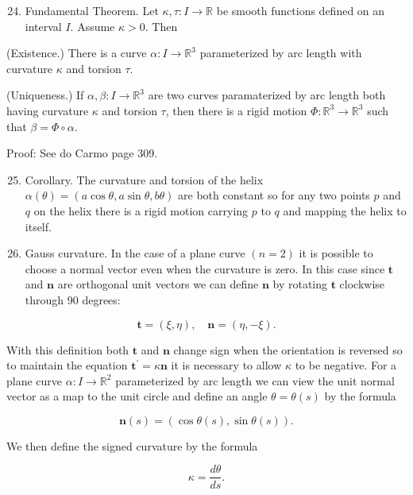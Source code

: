 \documentclass[10pt]{article}
\begin{document}
\begin{enumerate}
  \setcounter{enumi}{23}
  \item Fundamental Theorem. Let $\kappa, \tau: I \rightarrow \mathbb{R}$ be smooth functions defined on an interval $I$. Assume $\kappa>0$. Then
\end{enumerate}

(Existence.) There is a curve $\alpha: I \rightarrow \mathbb{R}^{3}$ parameterized by arc length with curvature $\kappa$ and torsion $\tau$.

(Uniqueness.) If $\alpha, \beta: I \rightarrow \mathbb{R}^{3}$ are two curves paramaterized by arc length both having curvature $\kappa$ and torsion $\tau$, then there is a rigid motion $\Phi: \mathbb{R}^{3} \rightarrow \mathbb{R}^{3}$ such that $\beta=\Phi \circ \alpha$.

Proof: See do Carmo page 309.

\begin{enumerate}
  \setcounter{enumi}{24}
  \item Corollary. The curvature and torsion of the helix $\alpha(\theta)=(a \cos \theta, a \sin \theta, b \theta)$ are both constant so for any two points $p$ and $q$ on the helix there is a rigid motion carrying $p$ to $q$ and mapping the helix to itself.

  \item Gauss curvature. In the case of a plane curve $(n=2)$ it is possible to choose a normal vector even when the curvature is zero. In this case since $\mathbf{t}$ and $\mathbf{n}$ are orthogonal unit vectors we can define $\mathbf{n}$ by rotating $\mathbf{t}$ clockwise through 90 degrees:

\end{enumerate}

$$
\mathbf{t}=(\xi, \eta), \quad \mathbf{n}=(\eta,-\xi) .
$$

With this definition both $\mathbf{t}$ and $\mathbf{n}$ change sign when the orientation is reversed so to maintain the equation $\mathbf{t}^{\prime}=\kappa \mathbf{n}$ it is necessary to allow $\kappa$ to be negative. For a plane curve $\alpha: I \rightarrow \mathbb{R}^{2}$ parameterized by arc length we can view the unit normal vector as a map to the unit circle and define an angle $\theta=\theta(s)$ by the formula

$$
\mathbf{n}(s)=(\cos \theta(s), \sin \theta(s)) .
$$

We then define the signed curvature by the formula

$$
\kappa=\frac{d \theta}{d s} .
$$
\end{document}
